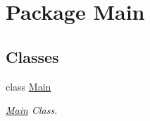 \hypertarget{namespace_main}{}\section{Package Main}
\label{namespace_main}
\subsection*{Classes}
\begin{DoxyCompactItemize}
\item 
class \hyperlink{class_main_1_1_main}{Main}
\begin{DoxyCompactList}\small\item\em \hyperlink{class_main_1_1_main}{Main} Class. \end{DoxyCompactList}\end{DoxyCompactItemize}
